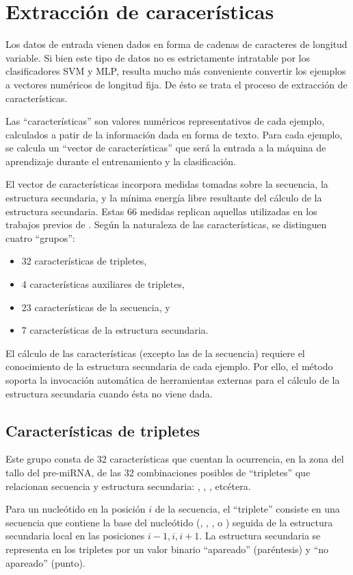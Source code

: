 \section{Extracción de caracerísticas}
Los datos de entrada vienen dados en forma de cadenas de caracteres de
longitud variable. Si bien este tipo de datos no es estrictamente
intratable por los clasificadores SVM y MLP, resulta mucho más
conveniente convertir los ejemplos a vectores numéricos de longitud
fija. De ésto se trata el proceso de extracción de características.

Las ``características'' son valores numéricos representativos de cada
ejemplo, calculados a patir de la información dada en forma de texto.
Para cada ejemplo, se calcula un ``vector de características'' que
será la entrada a la máquina de aprendizaje durante el entrenamiento y
la clasificación.

El vector de características incorpora medidas tomadas sobre la
secuencia, la estructura secundaria, y la mínima energía libre
resultante del cálculo de la estructura secundaria.  Estas 66 medidas
replican aquellas utilizadas en los trabajos previos de \cite{xue, ng,
  batuwita}.  Según la naturaleza de las características, se
distinguen cuatro ``grupos'':

\begin{itemize}
\item 32 características de tripletes,
\item 4 características auxiliares de tripletes,
\item 23 características de la secuencia, y
\item 7 características de la estructura secundaria.
\end{itemize}
El cálculo de las características (excepto las de la secuencia)
requiere el conocimiento de la estructura secundaria de cada
ejemplo. Por ello, el método soporta la invocación automática de
herramientas externas para el cálculo de la estructura secundaria
cuando ésta no viene dada.

\subsection{Características de tripletes}
Este grupo consta de 32 características que cuentan la ocurrencia, en
la zona del tallo del pre-miRNA, de las 32 combinaciones posibles de
``tripletes'' que relacionan secuencia y estructura secundaria:
, , , etcétera.

Para un nucleótido en la posición $i$ de la secuencia, el ``triplete''
consiste en una secuencia que contiene la base del nucleótido (\ntA,
\ntC, \ntG, o \ntU) seguida de la estructura secundaria local en las
posiciones $i-1,i,i+1$. La estructura secundaria se representa en los
tripletes por un valor binario ``apareado'' \pairL (paréntesis) y ``no
apareado'' \noPair (punto).

